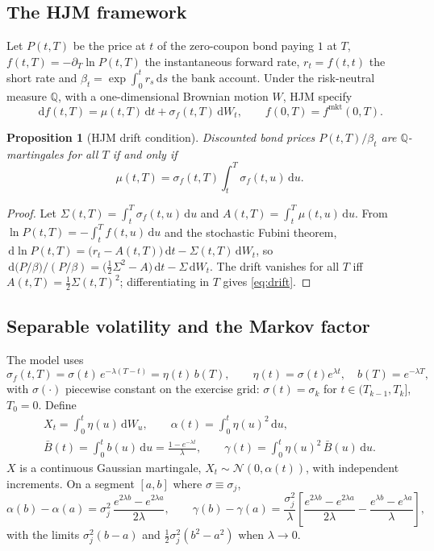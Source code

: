\documentclass[11pt,a4paper]{article}
\newtheorem{proposition}{Proposition}
\theoremstyle{definition}
\theoremstyle{remark}
\newcommand{\Q}{\mathbb{Q}}
\newcommand{\N}{\mathcal{N}}
\newcommand{\Bb}{\bar B}
\newcommand{\dd}{\,\mathrm{d}}
\begin{document}
\subsection{The HJM framework}
Let $P(t,T)$ be the price at $t$ of the zero-coupon bond paying $1$ at $T$, $f(t,T)=-\partial_T\ln P(t,T)$ the instantaneous
forward rate, $r_t=f(t,t)$ the short rate and $\beta_t=\exp\int_0^tr_s\dd s$ the bank account. Under the risk-neutral measure
$\Q$, with a one-dimensional Brownian motion $W$, HJM specify
\begin{equation}
  \dd f(t,T)=\mu(t,T)\dd t+\sigma_f(t,T)\dd W_t,\qquad f(0,T)=f^{\mathrm{mkt}}(0,T).
\end{equation}
\begin{proposition}[HJM drift condition]\label{prop:drift}
Discounted bond prices $P(t,T)/\beta_t$ are $\Q$-martingales for all $T$ if and only if
\begin{equation}\label{eq:drift}
  \mu(t,T)=\sigma_f(t,T)\int_t^T\sigma_f(t,u)\dd u .
\end{equation}
\end{proposition}
\begin{proof}
Let $\Sigma(t,T)=\int_t^T\sigma_f(t,u)\dd u$ and $A(t,T)=\int_t^T\mu(t,u)\dd u$. From $\ln P(t,T)=-\int_t^Tf(t,u)\dd u$ and
the stochastic Fubini theorem, $\dd\ln P(t,T)=\big(r_t-A(t,T)\big)\dd t-\Sigma(t,T)\dd W_t$, so
$\dd\big(P/\beta\big)/(P/\beta)=\big(\tfrac12\Sigma^2-A\big)\dd t-\Sigma\dd W_t$. The drift vanishes for all $T$ iff
$A(t,T)=\tfrac12\Sigma(t,T)^2$; differentiating in $T$ gives \eqref{eq:drift}.
\end{proof}

\subsection{Separable volatility and the Markov factor}
The model uses
\begin{equation}
  \sigma_f(t,T)=\sigma(t)\,e^{-\lambda(T-t)}=\eta(t)\,b(T),\qquad \eta(t)=\sigma(t)e^{\lambda t},\quad b(T)=e^{-\lambda T},
\end{equation}
with $\sigma(\cdot)$ piecewise constant on the exercise grid: $\sigma(t)=\sigma_k$ for $t\in(T_{k-1},T_k]$, $T_0=0$.
Define
\begin{equation}
\begin{gathered}
  X_t=\int_0^t\eta(u)\dd W_u,\qquad
  \alpha(t)=\int_0^t\eta(u)^2\dd u,\\
  \Bb(t)=\int_0^tb(u)\dd u=\frac{1-e^{-\lambda t}}{\lambda},\qquad
  \gamma(t)=\int_0^t\eta(u)^2\,\Bb(u)\dd u .
\end{gathered}
\end{equation}
$X$ is a continuous Gaussian martingale, $X_t\sim\N(0,\alpha(t))$, with independent increments. On a segment $[a,b]$ where
$\sigma\equiv\sigma_j$,
\begin{equation}\label{eq:alphagamma}
  \alpha(b)-\alpha(a)=\sigma_j^2\,\frac{e^{2\lambda b}-e^{2\lambda a}}{2\lambda},\qquad
  \gamma(b)-\gamma(a)=\frac{\sigma_j^2}{\lambda}\left[\frac{e^{2\lambda b}-e^{2\lambda a}}{2\lambda}-\frac{e^{\lambda b}-e^{\lambda a}}{\lambda}\right],
\end{equation}
with the limits $\sigma_j^2(b-a)$ and $\tfrac12\sigma_j^2(b^2-a^2)$ when $\lambda\to0$.
\end{document}
